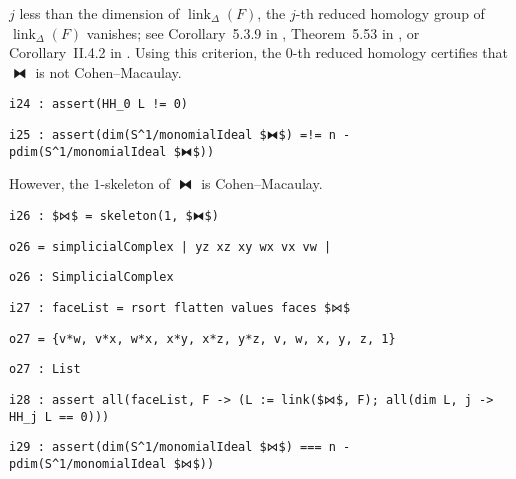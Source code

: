 \documentclass[12pt,leqno]{amsart}
\theoremstyle{definition}
\begin{document}
$j$ less than the dimension of $\operatorname{link}_\Delta(F)$, the $j$-th
reduced homology group of $\operatorname{link}_\Delta(F)$ vanishes; see
Corollary~5.3.9 in \cite{BH}, Theorem~5.53 in \cite{MS}, or Corollary~II.4.2
in \cite{Stanley}.  Using this criterion, the $0$-th reduced homology
certifies that $⧓$ is not Cohen--Macaulay.
\begin{lstlisting}[xleftmargin=10pt, aboveskip=3.0pt, belowskip=1.5pt]
i24 : assert(HH_0 L != 0)
\end{lstlisting}
\begin{lstlisting}[xleftmargin=10pt, aboveskip=1.5pt, belowskip=3.0pt]
i25 : assert(dim(S^1/monomialIdeal $⧓$) =!= n - pdim(S^1/monomialIdeal $⧓$))
\end{lstlisting}
However, the $1$-skeleton of $⧓$ is Cohen--Macaulay.
\begin{lstlisting}[xleftmargin=10pt, aboveskip=3.0pt, belowskip=1.5pt]
i26 : $⋈$ = skeleton(1, $⧓$)
\end{lstlisting}
\begin{lstlisting}[xleftmargin=10pt, aboveskip=1.5pt, belowskip=1.5pt]
o26 = simplicialComplex | yz xz xy wx vx vw |
\end{lstlisting}
\begin{lstlisting}[xleftmargin=10pt, aboveskip=1.5pt, belowskip=1.5pt]
o26 : SimplicialComplex
\end{lstlisting}
\begin{lstlisting}[xleftmargin=10pt, aboveskip=1.5pt, belowskip=1.5pt]
i27 : faceList = rsort flatten values faces $⋈$
\end{lstlisting}
\begin{lstlisting}[xleftmargin=10pt, lineskip=-10pt, aboveskip=4pt, belowskip=1pt]
o27 = {v*w, v*x, w*x, x*y, x*z, y*z, v, w, x, y, z, 1}
\end{lstlisting}
\begin{lstlisting}[xleftmargin=10pt, aboveskip=1.5pt, belowskip=1.5pt]
o27 : List
\end{lstlisting}
\begin{lstlisting}[xleftmargin=10pt, aboveskip=1.5pt, belowskip=1.5pt]
i28 : assert all(faceList, F -> (L := link($⋈$, F); all(dim L, j -> HH_j L == 0)))
\end{lstlisting}
\begin{lstlisting}[xleftmargin=10pt, aboveskip=1.5pt, belowskip=3.0pt]
i29 : assert(dim(S^1/monomialIdeal $⋈$) === n - pdim(S^1/monomialIdeal $⋈$))
\end{lstlisting}
\end{document}
